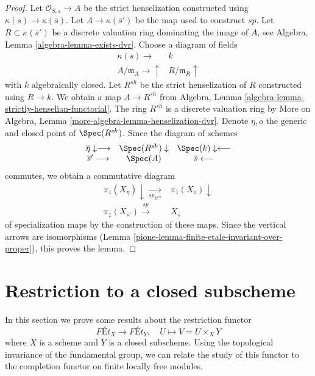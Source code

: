 \begin{proof}

Let $\mathcal{O}_{S, s} \to A$ be the strict henselization
constructed using $\kappa(s) \to \kappa(\overline{s})$.
Let $A \to \kappa(\overline{s}')$ be the map used to construct $sp$.
Let $R \subset \kappa(\overline{s}')$ be a discrete valuation ring
dominating the image of $A$, see Algebra, Lemma \ref{algebra-lemma-exists-dvr}.
Choose a diagram of fields
$$
\begin{array}{cc}\kappa(\overline{s}) \longrightarrow & k \\ A/\mathfrak m_A \longrightarrow\uparrow & R/\mathfrak m_R \uparrow\end{array}
$$
with $k$ algebraically closed. Let $R^{sh}$ be the strict
henselization of $R$ constructed using $R \to k$. We obtain
a map $A \to R^{sh}$ from Algebra, Lemma
\ref{algebra-lemma-strictly-henselian-functorial}.
The ring $R^{sh}$ is a discrete valuation ring by
More on Algebra, Lemma \ref{more-algebra-lemma-henselization-dvr}.
Denote $\eta, o$ the generic and closed point of $\Spec(R^{sh})$.
Since the diagram of schemes
$$
\begin{array}{ccc}\overline{\eta} \downarrow\longrightarrow & \Spec(R^{sh}) \downarrow & \Spec(k) \downarrow\longleftarrow \\ \overline{s}' \longrightarrow & \Spec(A) & \overline{s} \longleftarrow\end{array}
$$
commutes, we obtain a commutative diagram
$$
\begin{array}{cc}\pi_1(X_{\overline{\eta}}) \downarrow\underset{sp_{R^{sh}}}{\longrightarrow} & \pi_1(X_o) \downarrow \\ \pi_1(X_{\overline{s}'}) \overset{sp}{\longrightarrow} & X_{\overline{s}}\end{array}
$$
of specialization maps by the construction of these maps.
Since the vertical arrows are isomorphisms
(Lemma \ref{pione-lemma-finite-etale-invariant-over-proper}), this proves the lemma.
\end{proof}

\section{Restriction to a closed subscheme}
\label{pione-section-lefschetz}
In this section we prove some results about the restriction functor
$$
\textit{F\'Et}_X \longrightarrow \textit{F\'Et}_Y,\quad
U \longmapsto V = U \times_X Y
$$
where $X$ is a scheme and $Y$ is a closed subscheme. Using the
topological invariance of the fundamental group, we can relate
the study of this functor to the completion functor on
finite locally free modules.

